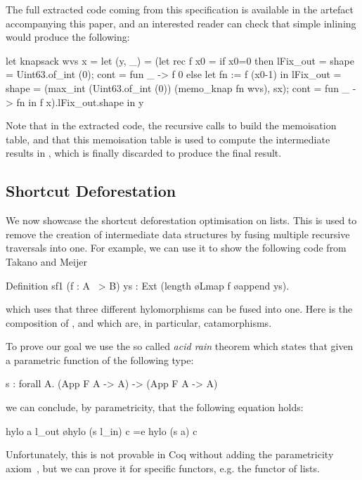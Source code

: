\documentclass[a4paper,UKenglish,cleveref, autoref, thm-restate]{lipics-v2021}
\begin{document}
The full extracted code coming from this specification is available in the
artefact accompanying this paper, and an interested reader can check that simple
inlining would produce the following:
\begin{ocamlcode}
let knapsack wvs x = let (y, _) = (let rec f x0 =
      if x0=0 then
        { lFix_out = {shape = Uint63.of_int (0); cont  = fun _ -> f 0 } }
      else let fn := f (x0-1) in { lFix_out = {
           shape = (max_int (Uint63.of_int (0)) (memo_knap fn wvs), sx);
           cont = fun _ -> fn } }
     in f x).lFix_out.shape in y
\end{ocamlcode}
Note that in the extracted code, the recursive calls to  build the
memoisation table, and that this memoisation table is used to compute the
intermediate results in , which is finally discarded to produce
the final result.

\subsection{Shortcut Deforestation}\label{sec:shortcut}
We now showcase the shortcut deforestation optimisation on lists.  This is used
to remove the creation of intermediate data structures by fusing multiple
recursive traversals into one.  For example, we can use it to show the following
code from Takano and
Meijer~\cite{TakanoM95}
\begin{coqcode}
Definition sf1 (f : A ~> B) ys : Ext (length \o Lmap f \o append ys).
\end{coqcode}
which uses that three different hylomorphisms can be fused into one.
Here  is the composition of ,
 and  which are, in particular,
catamorphisms.

To prove our goal we use the so called \emph{acid rain} theorem which states
that given a parametric function of the following type:
\begin{coqcode}
  s  : forall A. (App F A -> A) -> (App F A -> A)
\end{coqcode}
we can conclude, by parametricity, that the following equation holds:
\begin{coqcode}
  hylo a l_out \o hylo (s l_in) c =e hylo (s a) c
\end{coqcode}
Unfortunately, this is not provable in Coq without adding the parametricity
axiom~\cite{keller_et_al:LIPIcs.CSL.2012.381}, but we can prove it for specific
functors, e.g. the functor of lists.
\end{document}
